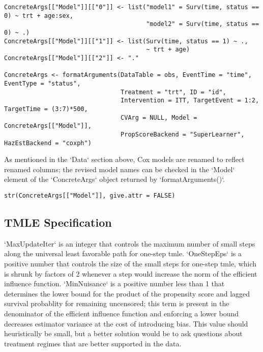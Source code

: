 \documentclass{report}
\newcommand{\1}{\ensuremath{\mathbf{1}}}
\begin{document}
\begin{lstlisting}
ConcreteArgs[["Model"]][["0"]] <- list("model1" = Surv(time, status == 0) ~ trt + age:sex,
                                       "model2" = Surv(time, status == 0) ~ .)
ConcreteArgs[["Model"]][["1"]] <- list(Surv(time, status == 1) ~ ., 
                                       ~ trt + age)
ConcreteArgs[["Model"]][["2"]] <- "."

ConcreteArgs <- formatArguments(DataTable = obs, EventTime = "time", EventType = "status", 
                                Treatment = "trt", ID = "id", 
                                Intervention = ITT, TargetEvent = 1:2, TargetTime = (3:7)*500, 
                                CVArg = NULL, Model = ConcreteArgs[["Model"]], 
                                PropScoreBackend = "SuperLearner", HazEstBackend = "coxph")
\end{lstlisting}

As mentioned in the `Data` section above, Cox models are renamed to reflect renamed columns; the revised model names can be checked in the `Model` element of the `ConcreteArgs` object returned by `formatArguments()`.

\begin{lstlisting}
str(ConcreteArgs[["Model"]], give.attr = FALSE)
\end{lstlisting}

\subsection{TMLE Specification}
`MaxUpdateIter` is an integer that controls the maximum number of small steps along the universal least favorable path for one-step tmle. `OneStepEps` is a positive number that controls the size of the small steps for one-step tmle, which is shrunk by factors of 2 whenever a step would increase the norm of the efficient influence function. `MinNuisance` is a positive number less than 1 that determines the lower bound for the product of the propensity score and lagged survival probablity for remaining uncensored; this term is present in the denominator of the efficient influence function and enforcing a lower bound decreases estimator variance at the cost of introducing bias. This value should heuristically be small, but a better solution would be to ask questions about treatment regimes that are better supported in the data.
\end{document}
